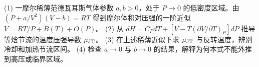(1) 一摩尔稀薄范德瓦耳斯气体参数 \(a,b>0\)，处于 \(P\to0\) 的低密度区域。由 \((P+a/V^2)(V-b)=RT\) 得到摩尔体积对压强的一阶近似 \(V=RT/P+B(T)+O(P)\)。
(2) 从 \(dH=C_PdT+[V-T(\partial V/\partial T)_P]dP\) 推导等焓节流的温度压强导数 \(\mu_{\rm JT}\)。
(3) 在上述稀薄近似下求 \(\mu_{\rm JT}\) 与反转温度，辨别冷却和加热节流区间。
(4) 检查 \(a\to0\) 与 \(b\to0\) 的结果，解释为何本式不能外推到高压或临界区域。

